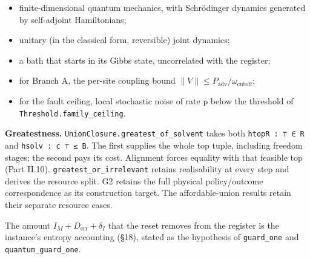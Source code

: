 \documentclass[
]{article}
\providecommand{\tightlist}{%
  \setlength{\itemsep}{0pt}\setlength{\parskip}{0pt}}
\begin{document}
\begin{itemize}
\tightlist
\item
  finite-dimensional quantum mechanics, with Schrödinger dynamics
  generated by self-adjoint Hamiltonians;
\item
  unitary (in the classical form, reversible) joint dynamics;
\item
  a bath that starts in its Gibbs state, uncorrelated with the register;
\item
  for Branch A, the per-site coupling bound
  \(\lVert V\rVert \le P_{\mathrm{adv}}/\omega_{\mathrm{cutoff}}\);
\item
  for the fault ceiling, local stochastic noise of rate p below the
  threshold of
  \texttt{T\allowbreak{}h\allowbreak{}r\allowbreak{}e\allowbreak{}s\allowbreak{}h\allowbreak{}o\allowbreak{}l\allowbreak{}d\allowbreak{}.\allowbreak{}f\allowbreak{}a\allowbreak{}m\allowbreak{}i\allowbreak{}l\allowbreak{}y\allowbreak{}\_\allowbreak{}c\allowbreak{}e\allowbreak{}i\allowbreak{}l\allowbreak{}i\allowbreak{}n\allowbreak{}g}.
\end{itemize}

\textbf{Greatestness.}
\texttt{U\allowbreak{}n\allowbreak{}i\allowbreak{}o\allowbreak{}n\allowbreak{}C\allowbreak{}l\allowbreak{}o\allowbreak{}s\allowbreak{}u\allowbreak{}r\allowbreak{}e\allowbreak{}.\allowbreak{}g\allowbreak{}r\allowbreak{}e\allowbreak{}a\allowbreak{}t\allowbreak{}e\allowbreak{}s\allowbreak{}t\allowbreak{}\_\allowbreak{}o\allowbreak{}f\allowbreak{}\_\allowbreak{}s\allowbreak{}o\allowbreak{}l\allowbreak{}v\allowbreak{}e\allowbreak{}n\allowbreak{}t}
takes both \texttt{htopR\ :\ ⊤\ ∈\ R} and \texttt{hsolv\ :\ c\ ⊤\ ≤\ B}.
The first supplies the whole top tuple, including freedom stages; the
second pays its cost. Alignment forces equality with that feasible top
(Part II.10).
\texttt{g\allowbreak{}r\allowbreak{}e\allowbreak{}a\allowbreak{}t\allowbreak{}e\allowbreak{}s\allowbreak{}t\allowbreak{}\_\allowbreak{}o\allowbreak{}r\allowbreak{}\_\allowbreak{}i\allowbreak{}r\allowbreak{}r\allowbreak{}e\allowbreak{}l\allowbreak{}e\allowbreak{}v\allowbreak{}a\allowbreak{}n\allowbreak{}t}
retains realisability at every step and derives the resource split. G2
retains the full physical policy/outcome correspondence as its
construction target. The affordable-union results retain their separate
resource cases.

The amount \(I_M + D_{\mathrm{err}} + \delta_I\) that the reset removes
from the register is the instance's entropy accounting (§18), stated as
the hypothesis of \texttt{guard\_one} and
\texttt{q\allowbreak{}u\allowbreak{}a\allowbreak{}n\allowbreak{}t\allowbreak{}u\allowbreak{}m\allowbreak{}\_\allowbreak{}g\allowbreak{}u\allowbreak{}a\allowbreak{}r\allowbreak{}d\allowbreak{}\_\allowbreak{}o\allowbreak{}n\allowbreak{}e}.
\end{document}
